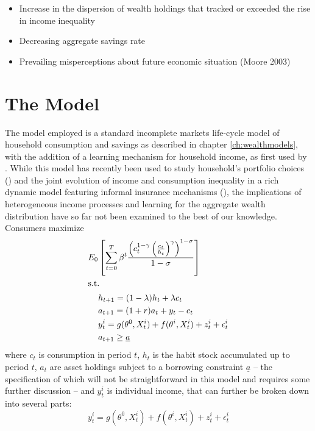 \begin{itemize}
\item Increase in the dispersion of wealth holdings that tracked or exceeded the 
rise in income inequality
\item Decreasing aggregate savings rate
\item Prevailing misperceptions about future economic situation (Moore 2003)
\end{itemize}

\pagebreak
\section{The Model}\label{sec:model}
The model employed is a standard incomplete markets life-cycle model of household  
consumption and savings as described in chapter \ref{ch:wealthmodels}, with the
addition of a learning mechanism for household income, as first used by 
\citet{Guvenen2007}. While this model has recently been used to study household's
portfolio choices (\citealt{ChangHongKarabarbounis2015}) and the joint evolution 
of income and consumption inequality in a rich dynamic model featuring informal
insurance mechanisms (\citealt{GuvenenSmith2014}), the implications of heterogeneous
income processes and learning for the aggregate wealth distribution have so far
not been examined to the best of our knowledge.
Consumers maximize
\begin{align}
E_0 &\left[ \sum_{t=0}^{T} \beta^{t} \frac{\left( c_{t}^{1-\gamma} \left( 
\frac{c_{t}}{h_{t}} \right)^{\gamma} \right)^{1-\sigma}}{1-\sigma} \right] \label{eq:maxprob} \\
\intertext{s.t. } &h_{t+1} = (1-\lambda)h_t + \lambda c_t \label{eq:habits} \\
			      &a_{t+1} = (1+r)a_t + y_t - c_t \label{eq:bc} \\
				  &y_{t}^i = g(\theta^0, X_t^i) + f(\theta^i, X_t^i) + z_t^i + \epsilon_t^i \label{eq:incproc} \\
  				  &a_{t+1} \geq \underline{a} \label{eq:borrcons} 
\end{align}
where $c_t$ is consumption in period $t$, $h_t$ is the habit stock accumulated up 
to period $t$, $a_t$ are asset holdings subject to a borrowing constraint 
$\underline{a}$ -- the specification of which will not be straightforward in 
this model and requires some further discussion -- and $y_t^i$ is individual 
income, that can further be broken down into several parts: 
\begin{equation*}
y_{t}^i = g(\theta^0, X_t^i) + f(\theta^i, X_t^i) + z_t^i + \epsilon_t^i 
\end{equation*}
